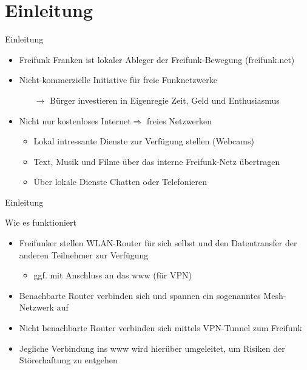 \section{Einleitung}

\begin{frame}{Einleitung}
    \begin{itemize}
        \item Freifunk Franken ist lokaler Ableger der Freifunk-Bewegung (freifunk.net)
        \item Nicht-kommerzielle Initiative für freie Funknetzwerke\\
        \begin{itemize}
            \item[$\rightarrow$] Bürger investieren in Eigenregie Zeit, Geld und Enthusiasmus
        \end{itemize}
        \item Nicht nur \glqq{}kostenloses Internet\grqq $\Rightarrow$ \glqq{}freies Netzwerken\grqq\\
        \begin{itemize}
            \item Lokal intressante Dienste zur Verfügung stellen (Webcams)
            \item Text, Musik und Filme über das interne Freifunk-Netz übertragen
            \item Über lokale Dienste Chatten oder Telefonieren
        \end{itemize}
    \end{itemize}
\end{frame}

\begin{frame}{Einleitung}
    \begin{block}{Wie es funktioniert}
        \begin{itemize}
            \item Freifunker stellen WLAN-Router für sich selbst und den Datentransfer der anderen Teilnehmer zur Verfügung
            \begin{itemize}
                \item ggf. mit Anschluss an das www (für VPN)
            \end{itemize}
            \item Benachbarte Router verbinden sich und spannen ein sogenanntes Mesh-Netzwerk auf
            \item Nicht benachbarte Router verbinden sich mittels VPN-Tunnel zum Freifunk
            \item Jegliche Verbindung ins www wird hierüber umgeleitet, um Risiken der Störerhaftung zu entgehen
        \end{itemize}
    \end{block}
\end{frame}

